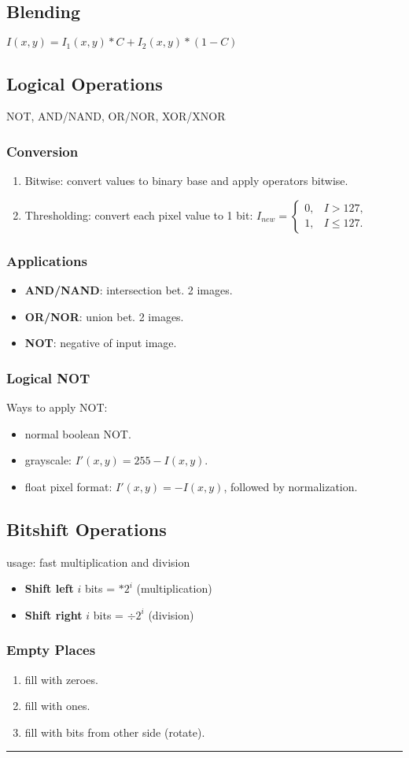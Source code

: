 \subsection{Blending}
$I(x,y) = I_1(x,y) * C +  I_2(x,y) * (1-C)$\\
\subsection{Logical Operations}
\textsc{NOT, AND/NAND, OR/NOR, XOR/XNOR}
\subsubsection{Conversion}
\begin{enumerate}
  \item Bitwise: convert values to binary base and apply operators bitwise.
  \item Thresholding: convert each pixel value to 1 bit:
$
  I_{new} =
  \begin{cases}
    0, & I > 127,\\
    1, & I \leq 127.
  \end{cases}
$
\end{enumerate}
\subsubsection{Applications}
\begin{itemize}
  \item \textbf{AND/NAND}: intersection bet. 2 images.
  \item \textbf{OR/NOR}: union bet. 2 images.
  \item \textbf{NOT}: negative of input image.
\end{itemize}
\subsubsection{Logical NOT}
Ways to apply NOT:
\begin{itemize}
  \item normal boolean NOT.
  \item grayscale: $I'(x,y) = 255 - I(x,y)$.
  \item float pixel format: $I'(x,y) = - I(x,y)$, followed by normalization.
\end{itemize}
\subsection{Bitshift Operations}
usage: fast multiplication and division
\begin{itemize}
  \item \textbf{Shift left} $i$ bits = $* 2^i$ (multiplication)
  \item \textbf{Shift right} $i$ bits = $\div 2^i$ (division)
\end{itemize}
\subsubsection{Empty Places}
\begin{enumerate}
  \item fill with zeroes.
  \item fill with ones.
  \item fill with bits from other side (rotate).
\end{enumerate}
\hrule
